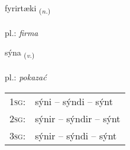 \documentclass[frontgrid, backgrid]{flacards}\usepackage[]{graphicx}\usepackage[]{xcolor}
\begin{document}
\renewcommand{\flhead}{\vskip5pt \fboxsep=0pt {\small\bfseries\footnotesize Nafnorð | rzeczownik}}
\renewcommand{\fcfoot}{\vskip5pt \fboxsep=0pt \hspace{2pt}{\small\bfseries\footnotesize 1K}}

\renewcommand{\blhead}{\vskip5pt {\small\bfseries\footnotesize Nafnorð | rzeczownik }}
\renewcommand{\bcfoot}{\vskip5pt \hspace{2pt}{\small\bfseries\footnotesize 1K}}


{fyrirtæki \small{\textsubscript{(\textit{n.})}} \\[1ex] %
 \\
pl.: \emph{firma} \\  [2ex]
\renewcommand*{\arraystretch}{0.8}
}

\renewcommand{\flhead}{\vskip5pt \fboxsep=0pt {\small\bfseries\footnotesize Sagnorð | czasownik}}
\renewcommand{\fcfoot}{\vskip5pt \fboxsep=0pt \hspace{2pt}{\small\bfseries\footnotesize 1K}}

\renewcommand{\blhead}{\vskip5pt {\small\bfseries\footnotesize Sagnorð | czasownik }}
\renewcommand{\bcfoot}{\vskip5pt \hspace{2pt}{\small\bfseries\footnotesize 1K}}


{sýna \small{\textsubscript{(\textit{v.})}} \\[1ex] %
\textphonetic{[siːna]} \\
pl.: \emph{pokazać} \\  [2ex]
\renewcommand*{\arraystretch}{0.8}
\begin{tabular}{p{1cm}l}
\textsc{1sg}: & sýni -- sýndi -- sýnt \\ 
\textsc{2sg}: & sýnir -- sýndir -- sýnt \\ 
\textsc{3sg}: & sýnir -- sýndi -- sýnt \\ 
\end{tabular}
}
\end{document}
